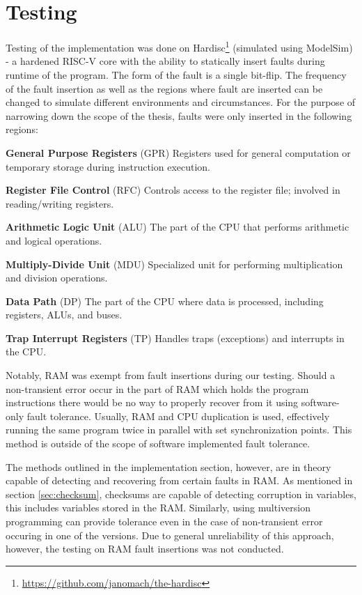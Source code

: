\section{Testing}

Testing of the implementation was done on Hardisc\footnote{\url{https://github.com/janomach/the-hardisc}} (simulated using ModelSim) - a hardened RISC-V core with the ability to statically insert faults during runtime of the program. The form of the fault is a single bit-flip. The frequency of the fault insertion as well as the regions where fault are inserted can be changed to simulate different environments and circumstances. For the purpose of narrowing down the scope of the thesis, faults were only inserted in the following regions:

\textbf{General Purpose Registers} (GPR)
Registers used for general computation or temporary storage during instruction execution.

\textbf{Register File Control} (RFC)
Controls access to the register file; involved in reading/writing registers.

\textbf{Arithmetic Logic Unit} (ALU)
The part of the CPU that performs arithmetic and logical operations.

\textbf{Multiply-Divide Unit} (MDU)
Specialized unit for performing multiplication and division operations.

\textbf{Data Path} (DP)
The part of the CPU where data is processed, including registers, ALUs, and buses.

\textbf{Trap Interrupt Registers} (TP)
Handles traps (exceptions) and interrupts in the CPU.

Notably, RAM was exempt from fault insertions during our testing. Should a non-transient error occur in the part of RAM which holds the program instructions there would be no way to properly recover from it using software-only fault tolerance. Usually, RAM and CPU duplication is used, effectively running the same program twice in parallel with set synchronization points. This method is outside of the scope of software implemented fault tolerance.

The methods outlined in the implementation section, however, are in theory capable of detecting and recovering from certain faults in RAM. As mentioned in section \ref{sec:checksum}, checksums are capable of detecting corruption in variables, this includes variables stored in the RAM. Similarly, using multiversion programming can provide tolerance even in the case of non-transient error occuring in one of the versions. Due to general unreliability of this approach, however, the testing on RAM fault insertions was not conducted.

